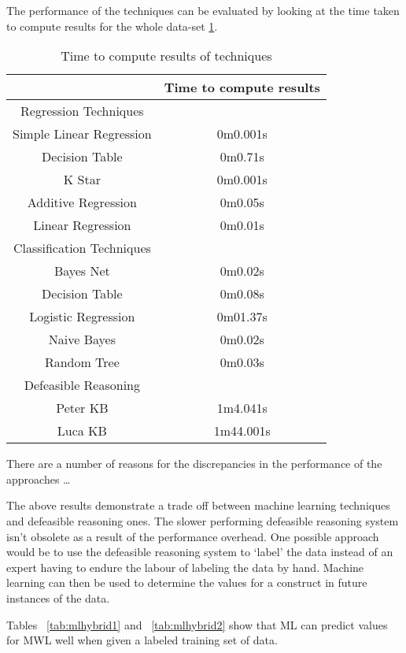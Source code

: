 The performance of the techniques can be evaluated by looking at the time taken to compute results for the whole data-set \ref{tab:timeperformance}.

\begin{table}[]
\centering
\begin{tabular}{|c|c|}
 & Time to compute results \\ \hline
Regression Techniques & \\ \hline
Simple Linear Regression & 0m0.001s\\
Decision Table & 0m0.71s\\
K Star & 0m0.001s\\
Additive Regression & 0m0.05s\\
Linear Regression & 0m0.01s\\ \hline
Classification Techniques & \\ \hline
Bayes Net &0m0.02s \\
Decision Table & 0m0.08s\\  
Logistic Regression & 0m01.37s\\ 
Naive Bayes & 0m0.02s\\ 
Random Tree & 0m0.03s\\ \hline
Defeasible Reasoning & \\ \hline
Peter KB & 1m4.041s\\
Luca KB & 1m44.001s\\
\end{tabular}
\caption{Time to compute results of techniques}
\label{tab:timeperformance}
\end{table}

There are a number of reasons for the discrepancies in the performance of the approaches \ldots


The above results demonstrate a trade off between machine learning techniques and defeasible reasoning ones. The slower performing defeasible reasoning system isn't obsolete as a result of the performance overhead. One possible approach would be to use the defeasible reasoning system to `label' the data instead of an expert having to endure the labour of labeling the data by hand. Machine learning can then be used to determine the values for a construct in future instances of the data. 

Tables ~\ref{tab:mlhybrid1} and ~\ref{tab:mlhybrid2} show that ML can predict values for MWL well when given a labeled training set of data.

